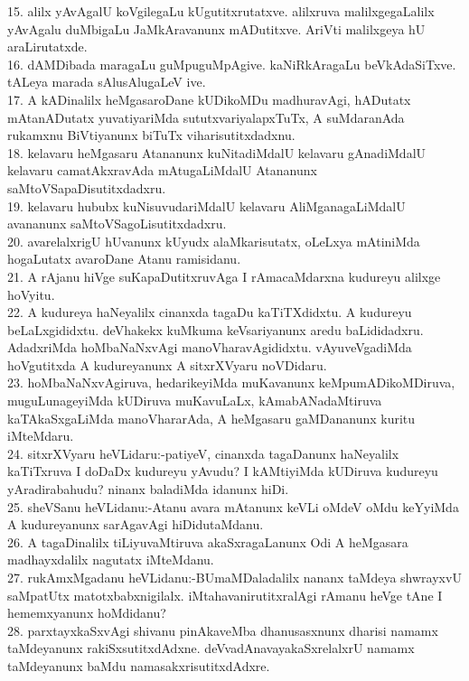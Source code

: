 \documentclass{article}
\begin{document}
15. alilx yAvAgalU koVgilegaLu kUgutitxrutatxve. alilxruva malilxgegaLalilx yAvAgalu duMbigaLu JaMkAravanunx mADutitxve. AriVti malilxgeya hU araLirutatxde.\\
16. dAMDibada maragaLu guMpuguMpAgive. kaNiRkAragaLu beVkAdaSiTxve. tALeya marada sAlusAlugaLeV ive.\\
17. A kADinalilx heMgasaroDane kUDikoMDu madhuravAgi, hADutatx mAtanADutatx yuvatiyariMda sututxvariyalapxTuTx, A suMdaranAda rukamxnu BiVtiyanunx biTuTx viharisutitxdadxnu.\\
18. kelavaru heMgasaru Atananunx kuNitadiMdalU kelavaru gAnadiMdalU kelavaru camatAkxravAda mAtugaLiMdalU Atananunx saMtoVSapaDisutitxdadxru.\\
19. kelavaru hububx kuNisuvudariMdalU kelavaru AliMganagaLiMdalU avananunx saMtoVSagoLisutitxdadxru.\\
20. avarelalxrigU hUvanunx kUyudx alaMkarisutatx, oLeLxya mAtiniMda hogaLutatx avaroDane Atanu ramisidanu.\\
21. A rAjanu hiVge suKapaDutitxruvAga I rAmacaMdarxna kudureyu alilxge hoVyitu.\\
22. A kudureya haNeyalilx cinanxda tagaDu kaTiTXdidxtu. A kudureyu beLaLxgididxtu. deVhakekx kuMkuma keVsariyanunx aredu baLididadxru. AdadxriMda hoMbaNaNxvAgi manoVharavAgididxtu. vAyuveVgadiMda hoVgutitxda A kudureyanunx A sitxrXVyaru noVDidaru.\\
23. hoMbaNaNxvAgiruva, hedarikeyiMda muKavanunx keMpumADikoMDiruva, muguLunageyiMda kUDiruva muKavuLaLx, kAmabANadaMtiruva kaTAkaSxgaLiMda manoVhararAda, A heMgasaru gaMDananunx kuritu iMteMdaru.\\
24. sitxrXVyaru heVLidaru:-patiyeV, cinanxda tagaDanunx haNeyalilx kaTiTxruva I doDaDx kudureyu yAvudu? I kAMtiyiMda kUDiruva kudureyu yAradirabahudu? ninanx baladiMda idanunx hiDi.\\
25. sheVSanu heVLidanu:-Atanu avara mAtanunx keVLi oMdeV oMdu keYyiMda A kudureyanunx sarAgavAgi hiDidutaMdanu.\\
26. A tagaDinalilx tiLiyuvaMtiruva akaSxragaLanunx Odi A heMgasara madhayxdalilx nagutatx iMteMdanu.\\
27. rukAmxMgadanu heVLidanu:-BUmaMDaladalilx nananx taMdeya shwrayxvU saMpatUtx matotxbabxnigilalx. iMtahavanirutitxralAgi rAmanu heVge tAne I hememxyanunx hoMdidanu?\\
28. parxtayxkaSxvAgi shivanu pinAkaveMba dhanusasxnunx dharisi namamx taMdeyanunx rakiSxsutitxdAdxne. deVvadAnavayakaSxrelalxrU namamx taMdeyanunx baMdu namasakxrisutitxdAdxre.\\
\end{document}
